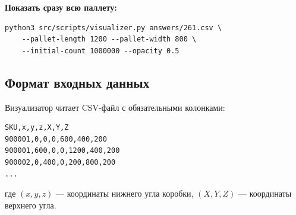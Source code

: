 \textbf{Показать сразу всю паллету:}
\begin{verbatim}
python3 src/scripts/visualizer.py answers/261.csv \
    --pallet-length 1200 --pallet-width 800 \
    --initial-count 1000000 --opacity 0.5
\end{verbatim}

\subsection{Формат входных данных}

Визуализатор читает CSV-файл с обязательными колонками:

\begin{verbatim}
SKU,x,y,z,X,Y,Z
900001,0,0,0,600,400,200
900001,600,0,0,1200,400,200
900002,0,400,0,200,800,200
...
\end{verbatim}

где $(x, y, z)$ --- координаты нижнего угла коробки, $(X, Y, Z)$ --- координаты верхнего угла.

